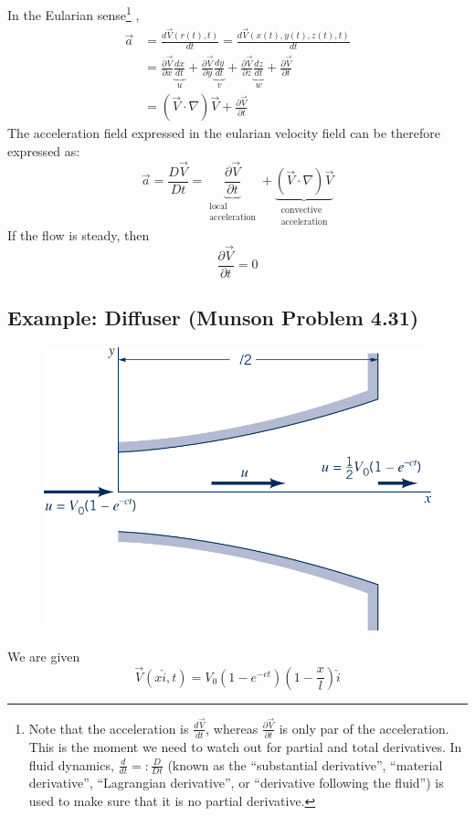 In the Eularian sense\footnote{Note that the acceleration is $\frac{d\vec V}{dt}$, whereas $\frac{\partial \vec V}{\partial t}$ is only par of the acceleration. This is the moment we need to watch out for partial and total derivatives. In fluid dynamics, $\frac{d}{dt} =: \frac{D}{Dt}$ (known as the \enquote{substantial derivative}, \enquote{material derivative}, \enquote{Lagrangian derivative}, or \enquote{derivative following the fluid}) is used to make sure that it is no partial derivative.} ,
\begin{equation*}
	\begin{split}
		\vec a &= \frac{d\vec V(r(t),t)}{dt} = \frac{d\vec V(x(t),y(t),z(t),t)}{dt} \\
		&= 
	\frac{\partial \vec V}{\partial x}\underbrace{\frac{dx}{dt}}_u + 
	\frac{\partial \vec V}{\partial y}\underbrace{\frac{dy}{dt}}_v + 
	\frac{\partial \vec V}{\partial z}\underbrace{\frac{dz}{dt}}_w + 
	\frac{\partial \vec V}{\partial t}\\
	&=(\vec V \cdot \nabla ) \vec V  + \frac{\partial \vec V}{\partial t}
	\end{split}
\end{equation*}
The acceleration field expressed in the eularian velocity field can be therefore expressed as:
\begin{equation*}
	\vec a = \frac{D\vec V}{Dt} = \underbrace{\frac{\partial \vec V}{\partial t}}_{\substack{\text{local}\\\text{acceleration}}} + \underbrace{(\vec V \cdot \nabla)\vec V}_{\substack{\text{convective}\\\text{acceleration}}}
\end{equation*}
If the flow is steady, then \begin{equation*}
	\frac{\partial \vec V}{\partial t} = 0
\end{equation*}

\subsection{Example: Diffuser (Munson Problem 4.31)}

\begin{figure}[H]
	\centering
	\includegraphics[width=0.4\linewidth]{Sketches/Diffuser}
	\label{fig:diffuser}
\end{figure}
We are given 
\begin{equation*}
	\vec V(x\hat i ,t ) = V_0(1-e^{-ct})\left(1-\frac xl\right)\hat i
\end{equation*}

